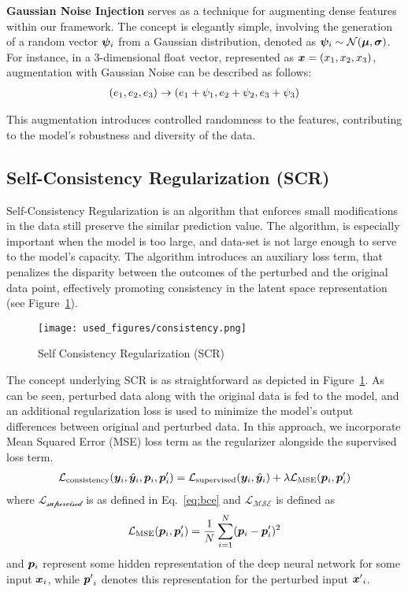 \textbf{Gaussian Noise Injection} serves as a technique for augmenting dense features within our framework. The concept is elegantly simple, involving the generation of a random vector ${\bm{\psi}}_i$ from a Gaussian distribution, denoted as ${\bm{\psi}}_i\sim\mathcal{N}({\bm{\mu}}, {\bm{\sigma}})$. 
For instance, in a 3-dimensional float vector, represented as ${\bm{x}} = ({x}_1, {x}_2, {x}_3)$, augmentation with Gaussian Noise can be described as follows:
\begin{align*}
({e}_1, {e}_2, {e}_3) \rightarrow ({e}_1 + \psi_1, {e}_2 + \psi_2, {e}_3 + \psi_3)
\end{align*}

This augmentation introduces controlled randomness to the features, contributing to the model's robustness and diversity of the data.


\subsection{Self-Consistency Regularization (SCR)}

Self-Consistency Regularization is an algorithm that enforces small modifications in the data still preserve the similar prediction value.
The algorithm, is especially important when the model is too large, and data-set is not large enough to serve to the model's capacity.
The algorithm introduces an auxiliary loss term, that penalizes the disparity between the outcomes of the perturbed and the original data point, effectively promoting consistency in the latent space representation (see Figure~\ref{fig:consistency}).
\begin{figure}[ht!]
  \centering
  \texttt{[image: used\_figures/consistency.png]}
  \caption{Self Consistency Regularization (SCR)}
\label{fig:consistency}
\end{figure}


The concept underlying SCR is as straightforward as depicted in Figure~\ref{fig:consistency}.
As can be seen, perturbed data along with the original data is fed to the model, and an additional regularization loss is used to minimize the model's output differences between original and perturbed data.
In this approach, we incorporate Mean Squared Error (MSE) loss term as the regularizer alongside the supervised loss term.
\begin{align*}
    \mathcal{L_{\text{consistency}}}({\bm{y}}_i,\hat{{\bm{y}}}_i,{\bm{p}}_i,{\bm{p}}'_i)  = \mathcal{L_{\text{supervised}}}({\bm{y}}_i,\hat{{\bm{y}}}_i) + \lambda \mathcal{L_{\text{MSE}}}({\bm{p}}_i,{\bm{p}}'_i)
\end{align*}
where $\mathcal{L_{\text{supervised}}}$ is as defined in Eq.~\ref{eq:bce} and $\mathcal{L_{\text{MSE}}}$ is defined as
\begin{align*}
\mathcal{L_{\text{MSE}}}({\bm{p}}_i,{\bm{p}}'_i)&= \frac{1}{N} \sum_{i=1}^{N}({\bm{p}}_i- {\bm{p}}'_i)^2\\
\end{align*}
and ${\bm{p}}_i$ represent some hidden representation of the deep neural network for some input ${\bm{x}}_i$, while ${{\bm{p}}'}_i$ denotes this representation for the perturbed input ${{\bm{x}}'}_i$.

